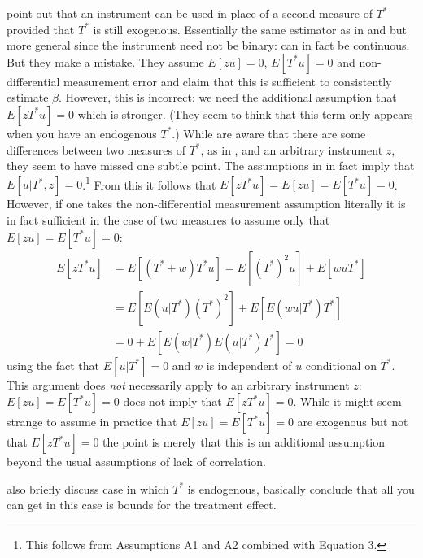 \cite{FL} point out that an instrument can be used in place of a second measure of $T^*$ provided that $T^*$ is still exogenous.
Essentially the same estimator as in \cite{BBS} and \cite{KRS} but more general since the instrument need not be binary: can in fact be continuous.
But they make a mistake. 
They assume $E[zu]=0$, $E[T^*u]=0$ and non-differential measurement error and claim that this is sufficient to consistently estimate $\beta$.
However, this is incorrect: we need the additional assumption that $E[zT^*u]=0$ which is stronger.
(They seem to think that this term only appears when you have an endogenous $T^*$.)
While \cite{FL} are aware that there are some differences between two measures of $T^*$, as in \cite{BBS}, and an arbitrary instrument $z$, they seem to have missed one subtle point.
The assumptions in \cite{BBS} in fact imply that $E[u|T^*,z]=0$.\footnote{This follows from Assumptions A1 and A2 combined with Equation 3.}
From this it follows that $E[zT^*u]=E[zu]=E[T^*u]=0$. 
However, if one takes the non-differential measurement assumption literally it is in fact sufficient in the case of two measures to assume only that $E[zu]=E[T^*u]=0$:
\begin{align}
  E[zT^*u] &= E[(T^*+w)T^*u] = E[(T^*)^2u] + E[wuT^*]  \\
  &= E\left[ E\left( u|T^* \right)(T^*)^2 \right] + E\left[E\left( wu|T^* \right)T^*\right]\\
  &= 0 + E\left[ E(w|T^*)E(u|T^*)T^* \right] = 0
\end{align}
using the fact that $E[u|T^*]=0$ and $w$ is independent of $u$ conditional on $T^*$.
This argument does \emph{not} necessarily apply to an arbitrary instrument $z$: $E[zu]=E[T^*u]=0$ does not imply that $E[zT^*u]=0$.
While it might seem strange to assume in practice that $E[zu]=E[T^*u]=0$ are exogenous but not that $E[zT^*u]=0$ the point is merely that this is an additional assumption beyond the usual assumptions of lack of correlation. 


\cite{FL} also briefly discuss case in which $T^*$ is endogenous, basically conclude that all you can get in this case is bounds for the treatment effect.

